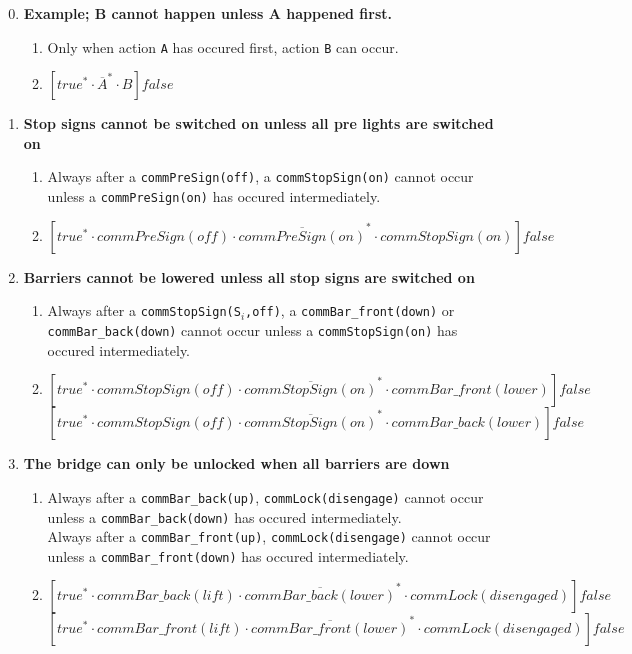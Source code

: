 \begin{enumerate}
  \setcounter{enumi}{-1}


  \item \textbf{Example; B cannot happen unless A happened first.}
  \begin{enumerate}
		\item Only when action \texttt{A} has occured first, action \texttt{B} can occur.
		\item $[true^* \cdot \overline{A}^{*} \cdot B]false$
	\end{enumerate}

	\item \textbf{Stop signs cannot be switched on unless all pre lights are switched on}
	\begin{enumerate}
		\item Always after a \texttt{commPreSign(off)}, a \texttt{commStopSign(on)} cannot occur unless a \texttt{commPreSign(on)} has occured intermediately.
		\item $[true^* \cdot commPreSign(off) \cdot \overline{commPreSign(on)}^{*} \cdot commStopSign(on)]false$
	\end{enumerate}

	\item \textbf{Barriers cannot be lowered unless all stop signs are switched on}
	\begin{enumerate}
		\item Always after a \texttt{commStopSign(S$_i$,off)}, a \texttt{commBar\_front(down)} or \texttt{commBar\_back(down)} cannot occur unless a \texttt{commStopSign(on)} has occured intermediately.
		\item $[true^* \cdot commStopSign(off) \cdot \overline{commStopSign(on)}^{*} \cdot commBar\_front(lower)]false$ \\
					$[true^* \cdot commStopSign(off) \cdot \overline{commStopSign(on)}^{*} \cdot commBar\_back(lower)]false$ \\
	\end{enumerate}

	\item \textbf{The bridge can only be unlocked when all barriers are down}
	\begin{enumerate}
		\item Always after a \texttt{commBar\_back(up)}, \texttt{commLock(disengage)} cannot occur unless a \texttt{commBar\_back(down)} has occured intermediately. \\
					Always after a \texttt{commBar\_front(up)}, \texttt{commLock(disengage)} cannot occur unless a \texttt{commBar\_front(down)} has occured intermediately.
		\item $[true^* \cdot commBar\_back(lift) \cdot \overline{commBar\_back(lower)}^{*} \cdot commLock(disengaged)]false$
					$[true^* \cdot commBar\_front(lift) \cdot \overline{commBar\_front(lower)}^{*} \cdot commLock(disengaged)]false$
	\end{enumerate}


\end{enumerate}
